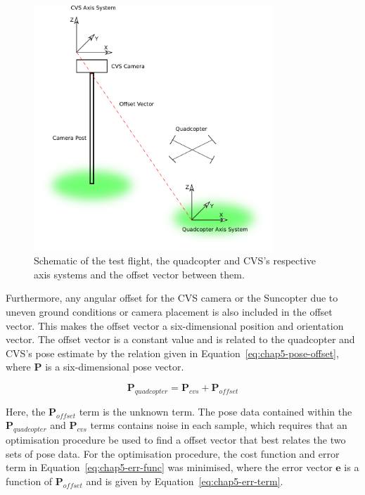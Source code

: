 \begin{figure}
  \centering
  \includegraphics[width=0.8\textwidth]{figures/chapter5/test_flight_schem}
  \caption[Shematic of the test flight layout.]{Schematic of the test flight, the quadcopter and CVS's respective axis systems and the offset vector between them.}
\label{fig:chap5-flight-test-schem}
\end{figure}

Furthermore, any angular offset for the CVS camera or the Suncopter due to uneven ground conditions or camera placement is also included in the offset vector. This makes the offset vector a six-dimensional position and orientation vector. The offset vector is a constant value and is related to the quadcopter and CVS's pose estimate by the relation given in Equation~\ref{eq:chap5-pose-offset}, where $\bm{P}$ is a six-dimensional pose vector. 

\begin{equation}
  \label{eq:chap5-pose-offset}
  \bm{P}_{quadcopter} = \bm{P}_{cvs} + \bm{P}_{of\!fset}
\end{equation}

Here, the $\bm{P}_{of\!fset}$ term is the unknown term. The pose data contained within the $\bm{P}_{quadcopter}$ and $\bm{P}_{cvs}$ terms contains noise in each sample, which requires that an optimisation procedure be used to find a offset vector that best relates the two sets of pose data. For the optimisation procedure, the cost function and error term in Equation~\ref{eq:chap5-err-func} was minimised, where the error vector $\bm{e}$ is a function of $\bm{P}_{of\!fset}$ and is given by Equation~\ref{eq:chap5-err-term}. 

